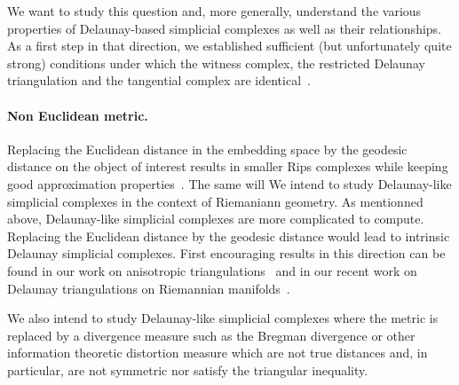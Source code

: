 We want to study this question and, more generally, understand the various properties of Delaunay-based simplicial complexes as well as their relationships. As a  first step in that direction, we established sufficient (but unfortunately quite strong) conditions under which the witness complex, the restricted Delaunay triangulation and the tangential complex are identical~\cite{boissonnat2012stab}. 

\paragraph{Non Euclidean metric.}
Replacing the Euclidean distance in the embedding space by the geodesic distance on the object of interest results in smaller Rips complexes while keeping good approximation properties~\cite{dl-clt-2009}. The same will We intend to study Delaunay-like simplicial complexes in the context of Riemaniann geometry. 
As mentionned above, Delaunay-like simplicial complexes are more complicated to compute. Replacing the Euclidean distance by  the geodesic distance would lead to intrinsic Delaunay simplicial complexes. First encouraging results in this direction can be found in our work on anisotropic triangulations~\cite{bwy-luam-08} and in our recent work on Delaunay triangulations on Riemannian manifolds~\cite{boissonnat2012stab}. 


We also intend to study Delaunay-like simplicial complexes where the metric is replaced by a divergence measure such as the Bregman divergence or other information theoretic distortion measure which are not true distances and, in particular, are not symmetric nor satisfy the triangular inequality.


